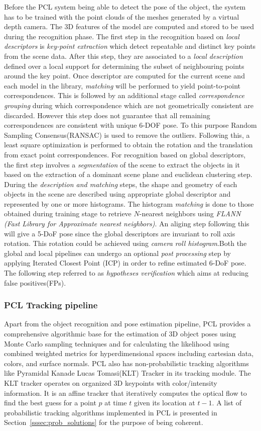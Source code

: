 Before the PCL system being able to detect the pose of the object, the system has to be trained with the point clouds of the meshes generated by a virtual depth camera. The 3D features of the model are computed and stored to be used during the recognition phase. The first step in the recognition based on \emph{local descriptors} is \emph{key-point extraction} which detect repeatable and distinct key points from the scene data. After this step, they are associated to a \emph{local description} defined over a local support for determining the subset of neighbouring points around the key point. Once descriptor are computed for the current scene and each model in the library, \emph{matching} will be performed to yield point-to-point correspondences. This is followed by an additional stage called \emph{correspondence grouping} during which correspondence which are not geometrically consistent are discarded. However this step does not guarantee that all remaining correspondences are consistent with unique 6-DOF pose. To this purpose Random Sampling Consensus(RANSAC) is used to remove the outliers. Following this, a least square optimization is performed to obtain the rotation and the translation from exact point correspondences. For recognition based on global descriptors, the first step involves a \emph{segmentation} of the scene to extract the objects in it based on the extraction of a dominant scene plane and euclidean clustering step. During the \emph{description and matching} steps, the shape and geometry of each objects in the scene are described using appropriate global descriptor and represented by one or more histograms. The histogram \emph{matching} is done to those obtained during training stage to retrieve $N$-nearest neighbors using \emph{FLANN (Fast Library for Approximate nearest neighbors)}. An aliging step following this will give a 5-DoF pose since the global descriptors are invariant to roll axis rotation. This rotation could be achieved using \emph{camera roll histogram}.Both the global and local pipelines can undergo an optional \emph{post processing} step by applying Iterated Closest Point (ICP) in order to refine estimated 6-DoF pose. The following step referred to as \emph{hypotheses verification} which aims at reducing false positives(FPs).
\subsubsection{PCL Tracking pipeline}
	Apart from the object recognition and pose estimation pipeline, PCL \cite{RUeda2012} provides a comprehensive algorithmic base for the estimation of 3D object poses using Monte Carlo sampling techniques and for calculating the likelihood using combined weighted metrics for hyperdimensional spaces including cartesian data, colors, and surface normals. PCL also has non-probabilistic tracking algorithms like Pyramidal Kanade Lucas Tomasi(KLT) Tracker in its tracking module. The KLT tracker operates on organized 3D keypoints with color/intensity information. It is an affine tracker that iteratively computes the optical flow to find the best guess for a point $p$ at time $t$ given its location at $t-1$. A list of probabilistic tracking algorithms implemented in PCL is presented in Section~\ref{sssec:prob_solutions} for the purpose of being coherent.
